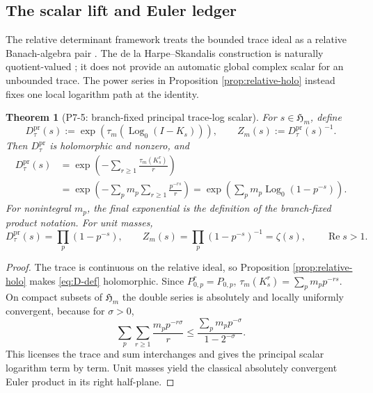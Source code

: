 \documentclass[11pt,a4paper]{article}
\newtheorem{theorem}{Theorem}[section]
\theoremstyle{definition}
\newcommand{\Log}{\operatorname{Log}}
\newcommand{\Dtau}{D^{\mathrm{pr}}_{\tau}}
\begin{document}
\subsection{The scalar lift and Euler ledger}

The relative determinant framework treats the bounded trace ideal as a
relative Banach-algebra pair \citep[Sections 6.2--6.4]{HochsKaadSchemaitat2018}.
The de la Harpe--Skandalis construction is naturally quotient-valued
\citep[Definition and Proposition 2]{deLaHarpeSkandalis1984}; it does not
provide an automatic global complex scalar for an unbounded trace.  The power
series in Proposition \ref{prop:relative-holo} instead fixes one local
logarithm path at the identity.

\begin{theorem}[P7-5: branch-fixed principal trace-log scalar]
\label{thm:p75}
For $s\in\mathfrak H_m$, define
\begin{equation}
 \Dtau(s)
 :=\exp\!\left(\tau_m(\Log_0(I-K_s))\right),
 \qquad Z_m(s):=\Dtau(s)^{-1}.
 \label{eq:D-def}
\end{equation}
Then $\Dtau$ is holomorphic and nonzero, and
\begin{align}
 \Dtau(s)
 &=\exp\!\left(-\sum_{r\geq1}\frac{\tau_m(K_s^r)}{r}\right)
   \label{eq:D-trace-log}\\
 &=\exp\!\left(-\sum_p m_p\sum_{r\geq1}\frac{p^{-rs}}{r}\right)
  =\exp\!\left(\sum_p m_p\Log_0(1-p^{-s})\right).
 \label{eq:D-product}
\end{align}
For nonintegral $m_p$, the final exponential is the definition of the
branch-fixed product notation.  For unit masses,
\begin{equation}
 \Dtau(s)=\prod_p(1-p^{-s}),
 \qquad Z_m(s)=\prod_p(1-p^{-s})^{-1}=\zeta(s),
 \qquad \operatorname{Re}s>1.
 \label{eq:unit-product}
\end{equation}
\end{theorem}

\begin{proof}
The trace is continuous on the relative ideal, so Proposition
\ref{prop:relative-holo} makes \eqref{eq:D-def} holomorphic.  Since
$P_{0,p}^r=P_{0,p}$,
$\tau_m(K_s^r)=\sum_pm_pp^{-rs}$.  On compact subsets of
$\mathfrak H_m$ the double series is absolutely and locally uniformly
convergent, because for $\sigma>0$,
\begin{equation}
 \sum_p\sum_{r\geq1}\frac{m_pp^{-r\sigma}}r
 \leq \frac{\sum_pm_pp^{-\sigma}}{1-2^{-\sigma}}.
\end{equation}
This licenses the trace and sum interchanges and gives the principal scalar
logarithm term by term.  Unit masses yield the classical absolutely
convergent Euler product in its right half-plane.
\end{proof}
\end{document}
